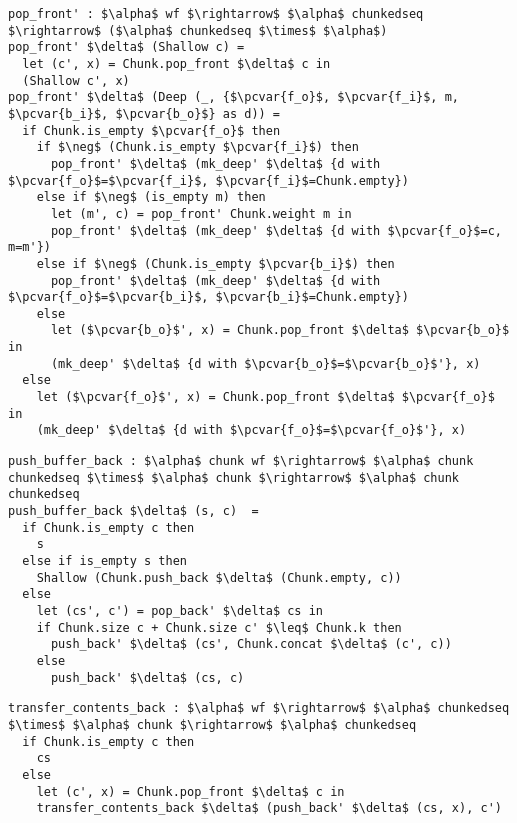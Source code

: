 \documentclass[10pt]{article}
\newcommand{\pcvar}[1]{\mathtt{#1}}
\begin{document}
\begin{lstlisting}[language=pcpp,style=nonumbers]
pop_front' : $\alpha$ wf $\rightarrow$ $\alpha$ chunkedseq $\rightarrow$ ($\alpha$ chunkedseq $\times$ $\alpha$)
pop_front' $\delta$ (Shallow c) =
  let (c', x) = Chunk.pop_front $\delta$ c in
  (Shallow c', x)
pop_front' $\delta$ (Deep (_, {$\pcvar{f_o}$, $\pcvar{f_i}$, m, $\pcvar{b_i}$, $\pcvar{b_o}$} as d)) =
  if Chunk.is_empty $\pcvar{f_o}$ then
    if $\neg$ (Chunk.is_empty $\pcvar{f_i}$) then
      pop_front' $\delta$ (mk_deep' $\delta$ {d with $\pcvar{f_o}$=$\pcvar{f_i}$, $\pcvar{f_i}$=Chunk.empty})
    else if $\neg$ (is_empty m) then 
      let (m', c) = pop_front' Chunk.weight m in
      pop_front' $\delta$ (mk_deep' $\delta$ {d with $\pcvar{f_o}$=c, m=m'})
    else if $\neg$ (Chunk.is_empty $\pcvar{b_i}$) then
      pop_front' $\delta$ (mk_deep' $\delta$ {d with $\pcvar{f_o}$=$\pcvar{b_i}$, $\pcvar{b_i}$=Chunk.empty})
    else
      let ($\pcvar{b_o}$', x) = Chunk.pop_front $\delta$ $\pcvar{b_o}$ in
      (mk_deep' $\delta$ {d with $\pcvar{b_o}$=$\pcvar{b_o}$'}, x)
  else
    let ($\pcvar{f_o}$', x) = Chunk.pop_front $\delta$ $\pcvar{f_o}$ in
    (mk_deep' $\delta$ {d with $\pcvar{f_o}$=$\pcvar{f_o}$'}, x)
\end{lstlisting}

\begin{lstlisting}[language=pcpp,style=nonumbers]
push_buffer_back : $\alpha$ chunk wf $\rightarrow$ $\alpha$ chunk chunkedseq $\times$ $\alpha$ chunk $\rightarrow$ $\alpha$ chunk chunkedseq
push_buffer_back $\delta$ (s, c)  =
  if Chunk.is_empty c then
    s
  else if is_empty s then
    Shallow (Chunk.push_back $\delta$ (Chunk.empty, c))
  else
    let (cs', c') = pop_back' $\delta$ cs in
    if Chunk.size c + Chunk.size c' $\leq$ Chunk.k then
      push_back' $\delta$ (cs', Chunk.concat $\delta$ (c', c))
    else
      push_back' $\delta$ (cs, c)
\end{lstlisting}

\begin{lstlisting}[language=pcpp,style=nonumbers]
transfer_contents_back : $\alpha$ wf $\rightarrow$ $\alpha$ chunkedseq $\times$ $\alpha$ chunk $\rightarrow$ $\alpha$ chunkedseq
  if Chunk.is_empty c then
    cs
  else
    let (c', x) = Chunk.pop_front $\delta$ c in
    transfer_contents_back $\delta$ (push_back' $\delta$ (cs, x), c')
\end{lstlisting}
\end{document}
